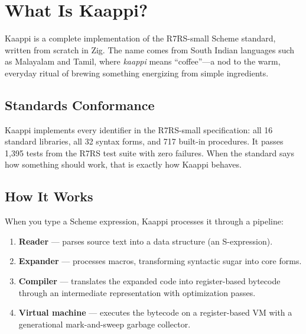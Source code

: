 \section{What Is Kaappi?}

Kaappi is a complete implementation of the R7RS-small Scheme standard, written from scratch in Zig. The name comes from South Indian languages such as Malayalam and Tamil, where \emph{kaappi} means ``coffee''---a nod to the warm, everyday ritual of brewing something energizing from simple ingredients.

\subsection{Standards Conformance}

Kaappi implements every identifier in the R7RS-small specification: all 16 standard libraries, all 32 syntax forms, and 717 built-in procedures. It passes 1,395 tests from the R7RS test suite with zero failures. When the standard says how something should work, that is exactly how Kaappi behaves.

\subsection{How It Works}

When you type a Scheme expression, Kaappi processes it through a pipeline:

\begin{center}
\end{center}

\begin{enumerate}
    \item \textbf{Reader} --- parses source text into a data structure (an S-expression).
    \item \textbf{Expander} --- processes macros, transforming syntactic sugar into core forms.
    \item \textbf{Compiler} --- translates the expanded code into register-based bytecode through an intermediate representation with optimization passes.
    \item \textbf{Virtual machine} --- executes the bytecode on a register-based VM with a generational mark-and-sweep garbage collector.
\end{enumerate}

